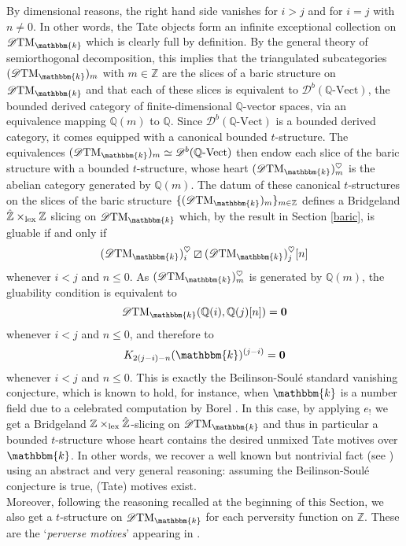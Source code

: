 \documentclass{article}
\theoremstyle{definition}
\newcommand{\Z}{\mathbb{Z}}
\newcommand{\orth}{\boxslash}
\newcommand{\lex}{\times_{\textnormal{lex}}}
\begin{document}
  By dimensional reasons, the right hand side vanishes for $i > j$ and for $i = j$ with $n \neq 0$. In other words, the Tate objects form an infinite exceptional collection on $\mathscr{D}\textnormal{TM}_\mathbbm{k}$ which is clearly full by definition. By the general theory of semiorthogonal decomposition, this implies that the triangulated subcategories $(\mathscr{D}\textnormal{TM}_\mathbbm{k})_{m}$ with $m\in \Z$ are the slices of a baric structure on $\mathscr{D}\textnormal{TM}_\mathbbm{k}$ and that each of these slices is equivalent to $\mathscr{D}^b(\mathbb{Q}\text{-Vect})$,
 the bounded derived category  of finite-dimensional $\mathbb{Q}$-vector spaces, via an equivalence mapping $\mathbb{Q}(m)$ to $\mathbb{Q}$. %
   Since $\mathscr{D}^b(\mathbb{Q}\text{-Vect})$ is a bounded derived category, it comes equipped with a canonical bounded $t$-structure. The equivalences $(\mathscr{D}\textnormal{TM}_\mathbbm{k})_{m}\simeq \mathscr{D}^b(\mathbb{Q}\text{-Vect})$ then endow each slice of the baric structure with a bounded $t$-structure, whose heart $(\mathscr{D}\textnormal{TM}_\mathbbm{k})_{m}^\heartsuit$ is the abelian category generated by $\mathbb{Q}(m)$. The datum of these canonical $t$-structures on the slices of the baric structure  $\{(\mathscr{D}\textnormal{TM}_\mathbbm{k})_{m}\}_{m\in \mathbb{Z}}$ defines a Bridgeland $\hat{\Z}\lex \Z$ slicing on $\mathscr{D}\textnormal{TM}_\mathbbm{k}$ which, by the result in Section \ref{baric}, is gluable if and only if  
\[
(\mathscr{D}\textnormal{TM}_\mathbbm{k})_{i}^\heartsuit\orth(\mathscr{D}\textnormal{TM}_\mathbbm{k})_{j}^\heartsuit[n]
\]
 whenever $i<j$ and $n\leq 0$. As $(\mathscr{D}\textnormal{TM}_\mathbbm{k})_{m}^\heartsuit$ is generated by $\mathbb{Q}(m)$, the gluability condition is equivalent to
 \[
   \mathscr{D}\textnormal{TM}_\mathbbm{k}(\mathbb{Q}(i),\mathbb{Q}(j)[n])=\mathbf{0}
    \]
 whenever $i<j$ and $n\leq 0$, and therefore to    
\[
K_{2(j-i)-n}(\mathbbm{k})^{(j-i)} = \mathbf{0}
\]  whenever  $i < j$ and $n \leq 0$. This is exactly the Beilinson-Soul\'e standard vanishing conjecture, which is known to hold, for instance, when $\mathbbm{k}$ is a number field due to a celebrated computation by Borel {\color{red}\cite{borel}}. In this case, by applying $e_!$ we get a Bridgeland $\Z \lex \hat{\Z}$-slicing on $\mathscr{D}\textnormal{TM}_\mathbbm{k}$ and thus in particular a bounded $t$-structure whose heart contains the desired unmixed Tate motives over $\mathbbm{k}$. In other words, we recover a well known but %
nontrivial fact (see \cite{levine}) using an abstract and very general reasoning: assuming the Beilinson-Soul\'e conjecture is true, (Tate) motives exist. \\
   Moreover, following the reasoning recalled at the beginning of this Section, we also get a $t$-structure on $\mathscr{D}\textnormal{TM}_\mathbbm{k}$ for each perversity function on $\mathbb{Z}$. These are the `\textit{perverse motives}' appearing in \cite{permot}. 
\end{document}
